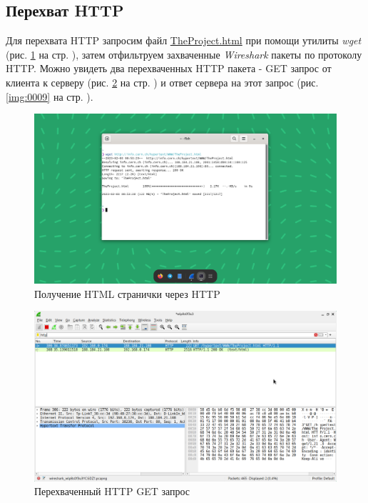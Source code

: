 \documentclass[a4paper]{article}
\begin{document}
  \subsection{Перехват HTTP}
  Для перехвата HTTP запросим файл \href{http://info.cern.ch/hypertext/WWW/TheProject.html}{TheProject.html} при 
  помощи утилиты \textit{wget} (рис. \ref{img:0007} на стр. \pageref{img:0007}), затем отфильтруем захваченные \textit{Wireshark} пакеты по 
  протоколу HTTP. Можно увидеть два перехваченных HTTP пакета - GET запрос от клиента к серверу
  (рис. \ref{img:0008} на стр. \pageref{img:0008}) и ответ сервера на этот запрос
  (рис. \ref{img:0009} на стр. \pageref{img:0009}).
  \begin{figure}[H]
    \centering
    \includegraphics[width=1.0\textwidth]{01_0007}
    \caption{Получение HTML странички через HTTP}
    \label{img:0007}
  \end{figure}
  \begin{figure}[H]
    \centering
    \includegraphics[width=1.0\textwidth]{01_0008}
    \caption{Перехваченный HTTP GET запрос}
    \label{img:0008}
  \end{figure}
\end{document}
